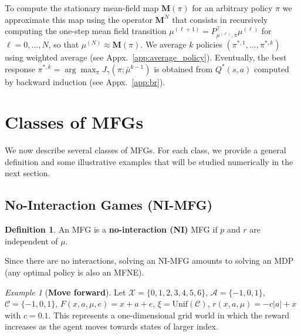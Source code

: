 \documentclass[10pt,twocolumn,letterpaper]{article}
\theoremstyle{definition}
\newtheorem{definition}[theorem]{Definition}
\theoremstyle{remark}
\newtheorem{example}{Example}
\newcommand{\states}{\mathcal{X}}
\newcommand{\actions}{\mathcal{A}}
\newcommand{\noises}{\mathcal{C}}
\newcommand{\unif}{\mathrm{Unif}}
\begin{document}
To compute the stationary mean-field map $\mathbf{M}(\pi)$ for an arbitrary policy $\pi$ we approximate this map using the operator $\mathbf{M}^N$ that consists in recursively computing the one-step mean field transition $\mu^{(\ell+1)} = P_{\mu^{(\ell)},\pi}^\top \mu^{(\ell)}$ for $\ell=0, \dots, N$, so that $\mu^{(N)}\approx\mathbf{M}(\pi)$. 
We average $k$ policies $(\pi^{*,1}, \dots, \pi^{*,k})$ using weighted average (see Appx.~\ref{app:average_policy}).
Eventually, the best response  $\pi^{*,k} = \arg\max_{\pi} J_{\gamma} (\pi;\bar\mu^{k-1})$ is obtained from $Q^*(s, a)$ computed by backward induction (see Appx.~\ref{app:br}).

\vspace{-0.3cm}
\section{Classes of MFGs}

We now describe several classes of MFGs. For each class, we provide a general definition and some illustrative examples that will be studied numerically in the next section.

\subsection{No-Interaction Games (NI-MFG)}

\begin{mdframed}[
    linewidth=0pt,        %
    roundcorner=5pt,        %
    backgroundcolor=blue!5, 
    innertopmargin=4pt, 
    innerbottommargin=6pt
]
\begin{definition}
    An MFG is a {\bf no-interaction (NI)} MFG if $p$ and $r$ are independent of $\mu$. 
\end{definition}
\end{mdframed}
\vspace{-0.2cm}
Since there are no interactions, solving an NI-MFG amounts to solving an MDP (any optimal policy is also an MFNE).
\begin{example}[\textbf{Move forward}]
    \label{ex:NI1}
    Let $\states = \{0,1,2,3,4,5,6\}$, $\actions = \{-1, 0, 1\}$, $\noises = \{-1,0,1\}$, $F(x,a,\mu,e) = x+a+e$, $\xi = \unif(\noises)$, $r(x, a, \mu) = -c |a| + x$ with $c=0.1$. This represents a one-dimensional grid world in which the reward increases as the agent moves towards states of larger index. 
\end{example}
\end{document}
